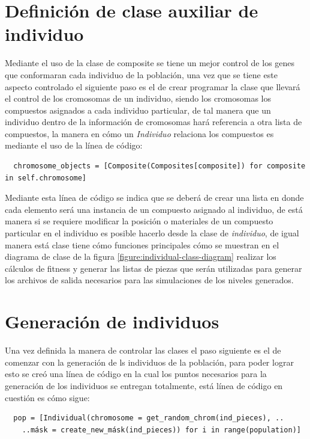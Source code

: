 \section{Definición de clase auxiliar de individuo}
\label{section:definition_of_clases}

Mediante el uso de la clase de composite se tiene un mejor control de los genes
que conformaran cada individuo de la población, una vez que se tiene este
aspecto controlado el siguiente paso es el de crear programar la clase que
llevará el control de los cromosomas de un individuo, siendo los cromosomas los
compuestos asignados a cada individuo particular, de tal manera que un individuo
dentro de la información de cromosomas hará referencia a otra lista de
compuestos, la manera en cómo un \textit{Individuo} relaciona los compuestos es
mediante el uso de la línea de código:

\begin{verbatim}
  chromosome_objects = [Composite(Composites[composite]) for composite in self.chromosome]
\end{verbatim}

Mediante esta línea de código se indica que se deberá de crear una lista en donde
cada elemento será una instancia de un compuesto asignado al individuo, de está
manera si se requiere modificar la posición o materiales de un compuesto
particular en el individuo es posible hacerlo desde la clase de
\textit{individuo}, de igual manera está clase tiene cómo funciones principales
cómo se muestran en el diagrama de clase de la figura
\ref{figure:individual-class-diagram} realizar los cálculos de fitness y generar
las listas de piezas que serán utilizadas para generar los archivos de salida
necesarios para las simulaciones de los niveles generados.

\section{Generación de individuos}
\label{section:ind_generation}

Una vez definida la manera de controlar las clases el paso siguiente es el de
comenzar con la generación de ls individuos de la población, para poder lograr
esto se creó una línea de código en la cual los puntos necesarios para la
generación de los individuos se entregan totalmente, está línea de código en
cuestión es cómo sigue: 

\begin{verbatim}
  pop = [Individual(chromosome = get_random_chrom(ind_pieces), ..
    ..másk = create_new_másk(ind_pieces)) for i in range(population)]
\end{verbatim}

